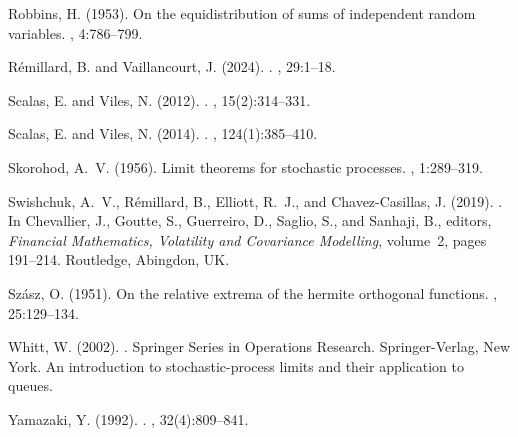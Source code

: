 \documentclass[final]{amsart}
\theoremstyle{definition}
\numberwithin{equation}{section}
\begin{document}
\begin{thebibliography}{}
Robbins, H. (1953).
\newblock On the equidistribution of sums of independent random variables.
, 4:786--799.

Rémillard, B. and Vaillancourt, J. (2024).
.
, 29:1--18.

Scalas, E. and Viles, N. (2012).
.
, 15(2):314--331.

Scalas, E. and Viles, N. (2014).
.
, 124(1):385--410.

Skorohod, A.~V. (1956).
\newblock Limit theorems for stochastic processes.
, 1:289--319.

Swishchuk, A.~V., Rémillard, B., Elliott, R.~J., and Chavez-Casillas, J.
  (2019).
.
\newblock In Chevallier, J., Goutte, S., Guerreiro, D., Saglio, S., and
  Sanhaji, B., editors, {\em Financial Mathematics, Volatility and Covariance
  Modelling}, volume~2, pages 191--214. Routledge, Abingdon, UK.

Sz\'asz, O. (1951).
\newblock On the relative extrema of the hermite orthogonal functions.
, 25:129--134.

Whitt, W. (2002).
.
\newblock Springer Series in Operations Research. Springer-Verlag, New York.
\newblock An introduction to stochastic-process limits and their application to
  queues.

Yamazaki, Y. (1992).
.
, 32(4):809--841.

\end{thebibliography}
\end{document}
